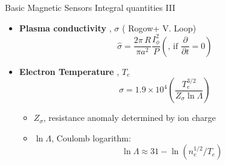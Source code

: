 \documentclass{beamer}
\begin{document}
\begin{frame}{Basic Magnetic Sensors } {Integral  quantities III}
   \begin{itemize}
	\item \textbf{ Plasma conductivity }, $\sigma$ ( Rogow+ V. Loop)
		$$ \hat{\sigma} =\frac{2 \pi\, R}{\pi a^2} \frac{I_\phi^2}{P} ( \textrm{,  if } \frac{\partial}{\partial t} =0 ) $$  
   	\item  \textbf{Electron Temperature }, $T_e$
	$$ \sigma = 1.9 \times 10^4 \left (\frac{T_e^{3/2}}{Z_\sigma \ln \Lambda } \right )  $$
	\begin{itemize}
		\item  $Z_\sigma$, resistance anomaly determined by ion charge 
		\item  $\ln \Lambda  $, Coulomb logarithm:
		$$ \ln \Lambda  \approx 31 - \ln(n_e^{1/2} / T_e)$$
	\end{itemize}

     \end{itemize}
\end{frame}
\end{document}
